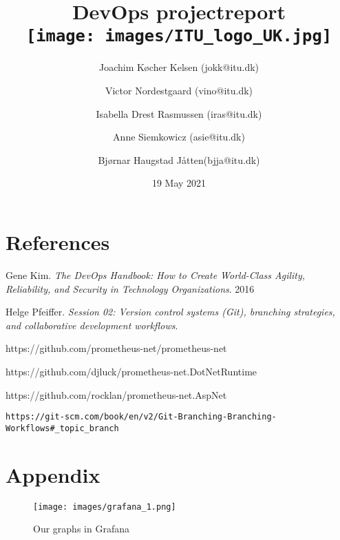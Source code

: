 \documentclass{article}
\title{DevOps projectreport \\[2ex] \texttt{[image: images/ITU\_logo\_UK.jpg]}}
\author{Joachim Køcher Kelsen (jokk@itu.dk) \and Victor Nordestgaard (vino@itu.dk) \and Isabella Drest Rasmussen (iras@itu.dk) \and Anne Siemkowicz (asie@itu.dk) \and Bjørnar Haugstad Jåtten(bjja@itu.dk)}
\date{19 May 2021}
\begin{document}
{}

\maketitle

\newpage

\tableofcontents

\newpage



\newpage



\newpage



\newpage



\newpage

\section{References}

\begin{thebibliography}{9}
Gene Kim.
\textit{The DevOps Handbook: How to Create World-Class Agility, Reliability, and Security in Technology Organizations}. 
2016

Helge Pfeiffer. 
\textit{Session 02: Version control systems (Git), branching strategies, and collaborative development workflows}. 

https://github.com/prometheus-net/prometheus-net

https://github.com/djluck/prometheus-net.DotNetRuntime

https://github.com/rocklan/prometheus-net.AspNet

\begin{verbatim}
https://git-scm.com/book/en/v2/Git-Branching-Branching-Workflows#_topic_branch
\end{verbatim}

\end{thebibliography}

\newpage

\section{Appendix}
\begin{figure}[h!]
    \centering
    \texttt{[image: images/grafana\_1.png]}
    \caption{ Our graphs in Grafana }
\end{figure}
\end{document}
